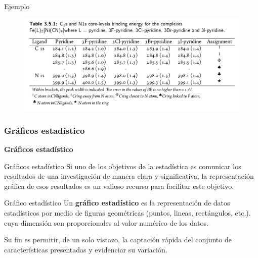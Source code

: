 \documentclass[11pt]{beamer}
\begin{document}
      \begin{frame}{Ejemplo}
          \begin{figure}
              \centering
              \includegraphics[width=0.9\linewidth]{images/Lecture_1g}
              \label{fig:lecture1g}
          \end{figure}

      \end{frame}

      \subsubsection*{Gráficos estadístico}

      \begin{frame}
        \begin{center}
          \textbf{    \huge      Gráficos estadístico}
        \end{center}
      \end{frame}


      \begin{frame}{Gráficos estadístico}
        Si uno de los objetivos de la estadística es comunicar los resultados de una investigación de manera clara y significativa, la representación gráfica de esos resultados  es un valioso recurso para facilitar este objetivo.
        \pause
        \begin{block}{Gráfico estadístico}
          Un \textbf{gráfico estadístico} es la representación de datos estadísticos por medio de figuras geométricas (puntos, lineas, rectángulos, etc.). cuya dimensión son proporcionales al valor numérico de los datos.

          Su fin es permitir, de un solo vistazo, la captación rápida del conjunto de características presentadas y evidenciar su variación.
        \end{block}
      \end{frame}
\end{document}

